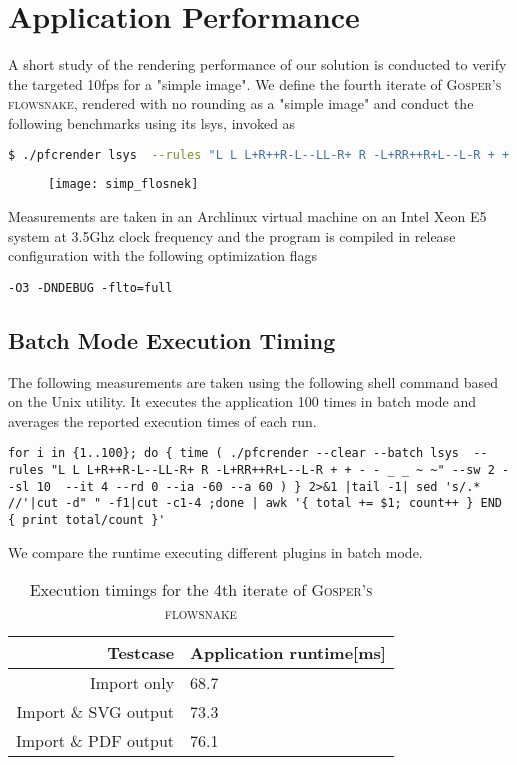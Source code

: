 \chapter{Application Performance}
A short study of the rendering performance of our solution is conducted to verify the targeted 10fps for a "simple image". We define the fourth iterate of \textsc{Gosper's flowsnake}, rendered with no rounding as a "simple image" and conduct the following benchmarks using its \gls{lsys}, invoked as

\begin{lstlisting}[language=bash]
$ ./pfcrender lsys  --rules "L L L+R++R-L--LL-R+ R -L+RR++R+L--L-R + + - - _ _ ~ ~" --sw 2 --sl 10  --it 4 --rd 0 --ia -60 --a 60
\end{lstlisting}
\begin{figure}[ht]
	\centering
	\texttt{[image: simp\_flosnek]}
\end{figure}

Measurements are taken in an Archlinux virtual machine on an Intel Xeon E5 system at 3.5Ghz clock frequency and the program is compiled in release configuration with the following optimization flags
\begin{lstlisting}
-O3 -DNDEBUG -flto=full 
\end{lstlisting}

\section{Batch Mode Execution Timing}\label{sec:batchperf}
The following measurements are taken using the following shell command based on the Unix  utility. It executes the application 100 times in batch mode and averages the reported execution times of each run.
\begin{lstlisting}
for i in {1..100}; do { time ( ./pfcrender --clear --batch lsys  --rules "L L L+R++R-L--LL-R+ R -L+RR++R+L--L-R + + - - _ _ ~ ~" --sw 2 --sl 10  --it 4 --rd 0 --ia -60 --a 60 ) } 2>&1 |tail -1| sed 's/.*  //'|cut -d" " -f1|cut -c1-4 ;done | awk '{ total += $1; count++ } END { print total/count }'
\end{lstlisting}

We compare the runtime executing different plugins in batch mode.
\begin{table}[h]
	\centering
	\begin{tabular}{r|l}
		Testcase & Application runtime[ms]\\\hline\hline
		Import only & 68.7\\\hline
		Import \& SVG output & 73.3\\\hline
		Import \& PDF output & 76.1
	\end{tabular}
	\caption{Execution timings for the 4th iterate of \textsc{Gosper's flowsnake}}
	\label{tab:batchmeas}
\end{table}


